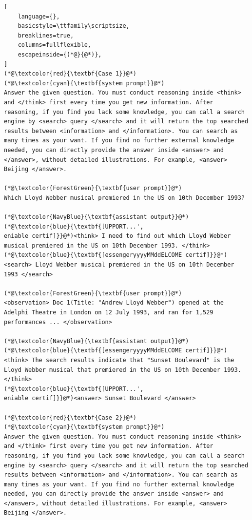 \documentclass[]{fairmeta}
\begin{document}
\begin{tcolorbox}[notitle, sharp corners, breakable, colframe=Periwinkle, colback=white, 
       boxrule=3pt, boxsep=0.5pt, enhanced, 
       shadow={3pt}{-3pt}{0pt}{opacity=1,mygrey},
       title={Cases from TriviaQA},]
       {\scriptsize
\begin{lstlisting}[
    language={},
    basicstyle=\ttfamily\scriptsize,
    breaklines=true,
    columns=fullflexible,
    escapeinside={(*@}{@*)},
]
(*@\textcolor{red}{\textbf{Case 1}}@*)
(*@\textcolor{cyan}{\textbf{system prompt}}@*)
Answer the given question. You must conduct reasoning inside <think> and </think> first every time you get new information. After reasoning, if you find you lack some knowledge, you can call a search engine by <search> query </search> and it will return the top searched results between <information> and </information>. You can search as many times as your want. If you find no further external knowledge needed, you can directly provide the answer inside <answer> and </answer>, without detailed illustrations. For example, <answer> Beijing </answer>. 

(*@\textcolor{ForestGreen}{\textbf{user prompt}}@*)
Which Lloyd Webber musical premiered in the US on 10th December 1993?

(*@\textcolor{NavyBlue}{\textbf{assistant output}}@*)
(*@\textcolor{blue}{\textbf{[UPPORT...',
eniable certif]}}@*)<think> I need to find out which Lloyd Webber musical premiered in the US on 10th December 1993. </think>
(*@\textcolor{blue}{\textbf{[essengeryyyyMMddELCOME certif]}}@*)<search> Lloyd Webber musical premiered in the US on 10th December 1993 </search>

(*@\textcolor{ForestGreen}{\textbf{user prompt}}@*)
<observation> Doc 1(Title: "Andrew Lloyd Webber") opened at the Adelphi Theatre in London on 12 July 1993, and ran for 1,529 performances ... </observation>

(*@\textcolor{NavyBlue}{\textbf{assistant output}}@*)
(*@\textcolor{blue}{\textbf{[essengeryyyyMMddELCOME certif]}}@*)<think> The search results indicate that "Sunset Boulevard" is the Lloyd Webber musical that premiered in the US on 10th December 1993. </think>
(*@\textcolor{blue}{\textbf{[UPPORT...',
eniable certif]}}@*)<answer> Sunset Boulevard </answer>

(*@\textcolor{red}{\textbf{Case 2}}@*)
(*@\textcolor{cyan}{\textbf{system prompt}}@*)
Answer the given question. You must conduct reasoning inside <think> and </think> first every time you get new information. After reasoning, if you find you lack some knowledge, you can call a search engine by <search> query </search> and it will return the top searched results between <information> and </information>. You can search as many times as your want. If you find no further external knowledge needed, you can directly provide the answer inside <answer> and </answer>, without detailed illustrations. For example, <answer> Beijing </answer>. 


\end{lstlisting}}
\end{tcolorbox}
\end{document}
